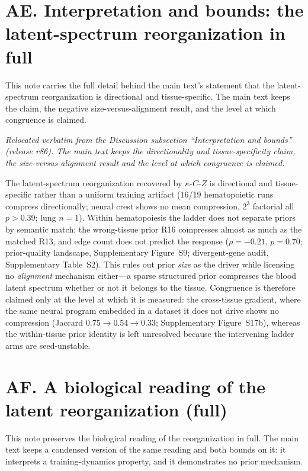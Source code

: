 \documentclass[11 pt,a4 paper]{article}
\begin{document}
\clearpage

\section*{AE. Interpretation and bounds: the latent-spectrum reorganization in full}

This note carries the full detail behind the main text's statement that the latent-spectrum
reorganization is directional and tissue-specific. The main text keeps the claim, the negative
size-versus-alignment result, and the level at which congruence is claimed.

\noindent\emph{Relocated verbatim from the Discussion subsection ``Interpretation and bounds'' (release r86). The main text keeps the directionality and tissue-specificity claim, the size-versus-alignment result and the level at which congruence is claimed.}

The latent-spectrum reorganization recovered by $\kappa$-$C$-$Z$ is directional and
tissue-specific rather than a uniform training artifact (16/19 hematopoietic runs
compress directionally; neural crest shows no mean compression, $2^{3}$ factorial
all $p>0.39$; lung $n=1$). Within hematopoiesis the ladder does not separate priors by semantic match: the
wrong-tissue prior R16 compresses almost as much as the matched R13, and edge count does not predict
the response ($\rho=-0.21$, $p=0.70$; prior-quality landscape, Supplementary Figure~S9; divergent-gene audit, Supplementary Table~S2). This rules out prior \emph{size} as the driver while licensing no
\emph{alignment} mechanism either---a sparse structured prior compresses the blood latent
spectrum whether or not it belongs to the tissue. Congruence is therefore claimed only at the level at which
it is measured: the cross-tissue gradient, where the same neural program embedded in a dataset it does not
drive shows no compression (Jaccard $0.75\to0.54\to0.33$; Supplementary Figure~S17b), whereas the
within-tissue prior identity is left unresolved because the intervening ladder arms are seed-unstable.

\clearpage

\section*{AF. A biological reading of the latent reorganization (full)}

This note preserves the biological reading of the reorganization in full. The main text keeps a
condensed version of the same reading and both bounds on it: it interprets a training-dynamics
property, and it demonstrates no prior mechanism.
\end{document}
